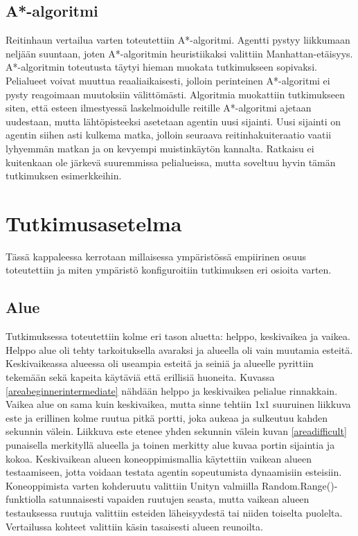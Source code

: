 \documentclass[utf8]{gradu3}
\begin{document}
\subsection{A*-algoritmi}

Reitinhaun vertailua varten toteutettiin A*-algoritmi. Agentti pystyy liikkumaan neljään suuntaan, joten A*-algoritmin heuristiikaksi valittiin Manhattan-etäisyys. A*-algoritmin toteutusta täytyi hieman muokata tutkimukseen sopivaksi. Pelialueet voivat muuttua reaaliaikaisesti, jolloin perinteinen A*-algoritmi ei pysty reagoimaan muutoksiin välittömästi. Algoritmia muokattiin tutkimukseen siten, että esteen ilmestyessä laskelmoidulle reitille A*-algoritmi ajetaan uudestaan, mutta lähtöpisteeksi asetetaan agentin uusi sijainti. Uusi sijainti on agentin siihen asti kulkema matka, jolloin seuraava reitinhakuiteraatio vaatii lyhyemmän matkan ja on kevyempi muistinkäytön kannalta. Ratkaisu ei kuitenkaan ole järkevä suuremmissa pelialueissa, mutta soveltuu hyvin tämän tutkimuksen esimerkkeihin.

\section{Tutkimusasetelma}
\label{sec:tutkimusasetelma}

Tässä kappaleessa kerrotaan millaisessa ympäristössä empiirinen osuus toteutettiin ja miten ympäristö konfiguroitiin tutkimuksen eri osioita varten.

\subsection{Alue}
\label{alue}

Tutkimuksessa toteutettiin kolme eri tason aluetta: helppo, keskivaikea ja vaikea. Helppo alue oli tehty tarkoituksella avaraksi ja alueella oli vain muutamia esteitä. Keskivaikeassa alueessa oli useampia esteitä ja seiniä ja alueelle pyrittiin tekemään sekä kapeita käytäviä että erillisiä huoneita. Kuvassa \ref{areabeginnerintermediate} nähdään helppo ja keskivaikea pelialue rinnakkain. Vaikea alue on sama kuin keskivaikea, mutta sinne tehtiin 1x1 suuruinen liikkuva este ja erillinen kolme ruutua pitkä portti, joka aukeaa ja sulkeutuu kahden sekunnin välein. Liikkuva este etenee yhden sekunnin välein kuvan \ref{areadifficult} punaisella merkityllä alueella ja toinen merkitty alue kuvaa portin sijaintia ja kokoa. Keskivaikean alueen koneoppimismallia käytettiin vaikean alueen testaamiseen, jotta voidaan testata agentin sopeutumista dynaamisiin esteisiin. Koneoppimista varten kohderuutu valittiin Unityn valmiilla Random.Range()-funktiolla satunnaisesti vapaiden ruutujen seasta, mutta vaikean alueen testauksessa ruutuja valittiin esteiden läheisyydestä tai niiden toiselta puolelta. Vertailussa kohteet valittiin käsin tasaisesti alueen reunoilta.
\end{document}
